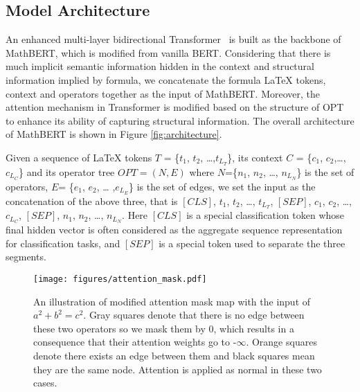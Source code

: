\documentclass{article}
\begin{document}
\subsection{Model Architecture}

An enhanced multi-layer bidirectional Transformer~\cite{Transformer} is built as the backbone of MathBERT, which is modified from vanilla BERT. Considering that there is much implicit semantic information hidden in the context and structural information implied by formula, we concatenate the formula \LaTeX{} tokens, context and operators together as the input of MathBERT. Moreover, the attention mechanism in Transformer is modified based on the structure of OPT to enhance its ability of capturing structural information. The overall architecture of MathBERT is shown in Figure \ref{fig:architecture}.

Given a sequence of LaTeX tokens $ T $ = \{$ t_1$, $t_2$, …,$t_{L_T}$\}, its context  $ C $ = \{$c_1$, $c_2$,…,$c_{L_C}$\} and its operator tree $ OPT=(N, E) $ where $ N$=\{$n_1$, $n_2$, …, $n_{L_N}$\} is the set of operators, $ E $= \{$e_1$, $e_2$, … ,$e_{L_E}$\} is the set of edges, we set the input as the concatenation of the above three, that is $ [CLS]$, $t_1$, $t_2$, …, $t_{L_T}$, $[SEP]$, $c_1$, $c_2$, …, $c_{L_C}$, $[SEP]$, $n_1$, $n_2$, …, $n_{L_N}$. Here $ [CLS] $ is a special classification token whose final hidden vector is often considered as the aggregate sequence representation for classification tasks, and $ [SEP] $ is a special token used to separate the three segments.

\begin{figure}[!t]
\vskip -0.25in
\begin{center}
\centerline{\texttt{[image: figures/attention\_mask.pdf]}}
\vskip -0.1in
\caption{An illustration of modified attention mask map with the input of $a^2+b^2=c^2$. Gray squares denote that there is no edge between these two operators so we mask them by 0, which results in a consequence that their attention weights go to -$\infty$. Orange squares denote there exists an edge between them and black squares mean they are the same node. Attention is applied as normal in these two cases.}
\label{figure-attenion_mask}
\end{center}
\vskip -0.4in
\end{figure}
\end{document}
